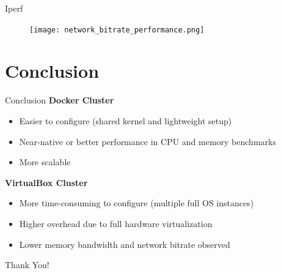 \documentclass[10pt]{beamer}
\begin{document}
\begin{frame}[fragile]{Iperf}
\begin{figure}
  \centering
  \texttt{[image: network\_bitrate\_performance.png]}
\end{figure}
\end{frame}

\section{Conclusion}

\begin{frame}{Conclusion}
  \textbf{Docker Cluster}
  \begin{itemize}
    \item Easier to configure (shared kernel and lightweight setup)
    \item Near-native or better performance in CPU and memory benchmarks
    \item More scalable
  \end{itemize}
  \textbf{VirtualBox Cluster}
  \begin{itemize}
    \item More time-consuming to configure (multiple full OS instances)
    \item Higher overhead due to full hardware virtualization
    \item Lower memory bandwidth and network bitrate observed
  \end{itemize}
\end{frame}

{
\begin{frame}[standout]
\thispagestyle{empty}
  {\LARGE Thank You!}
\end{frame}
}
\end{document}
